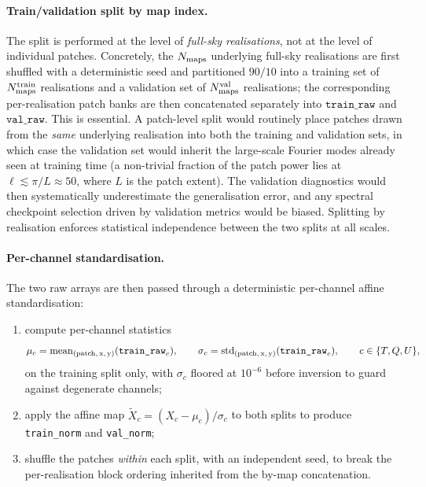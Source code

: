 \documentclass[11pt]{article}
\theoremstyle{definition}
\begin{document}
\paragraph{Train/validation split by map index.} The split is performed at the level of \emph{full-sky realisations}, not at the level of individual patches. Concretely, the $N_{\rm maps}$ underlying full-sky realisations are first shuffled with a deterministic seed and partitioned $90/10$ into a training set of $N_{\rm maps}^{\rm train}$ realisations and a validation set of $N_{\rm maps}^{\rm val}$ realisations; the corresponding per-realisation patch banks are then concatenated separately into $\texttt{train\_raw}$ and $\texttt{val\_raw}$. This is essential. A patch-level split would routinely place patches drawn from the \emph{same} underlying realisation into both the training and validation sets, in which case the validation set would inherit the large-scale Fourier modes already seen at training time (a non-trivial fraction of the patch power lies at $\ell\!\lesssim\!\pi/L\!\approx\!50$, where $L$ is the patch extent). The validation diagnostics would then systematically underestimate the generalisation error, and any spectral checkpoint selection driven by validation metrics would be biased. Splitting by realisation enforces statistical independence between the two splits at all scales.

\paragraph{Per-channel standardisation.} The two raw arrays are then passed through a deterministic per-channel affine standardisation:
\begin{enumerate}[leftmargin=2.0em,itemsep=0.1em]
  \item compute per-channel statistics
  \begin{equation}
    \mu_c = \mathrm{mean}_{(\rm patch,\,x,\,y)}(\texttt{train\_raw}_c),
    \qquad
    \sigma_c = \mathrm{std}_{(\rm patch,\,x,\,y)}(\texttt{train\_raw}_c),
    \qquad c\in\{T,Q,U\},
  \end{equation}
  on the training split only, with $\sigma_c$ floored at $10^{-6}$ before inversion to guard against degenerate channels;
  \item apply the affine map $\tilde X_c = (X_c-\mu_c)/\sigma_c$ to both splits to produce \texttt{train\_norm} and \texttt{val\_norm};
  \item shuffle the patches \emph{within} each split, with an independent seed, to break the per-realisation block ordering inherited from the by-map concatenation.
\end{enumerate}
\end{document}
